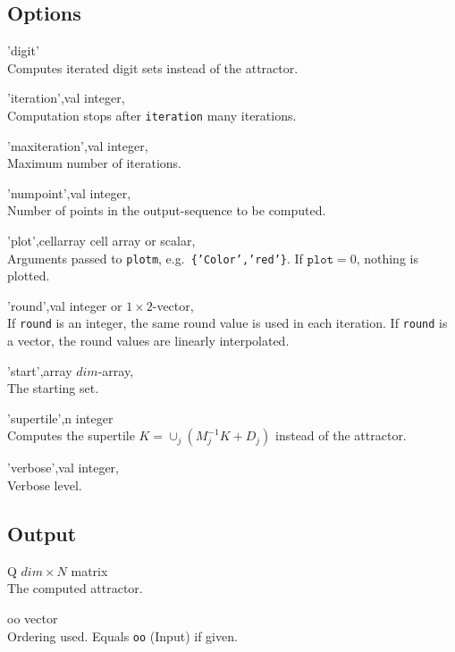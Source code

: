 \subsection*{Options}
\begin{param}
\item['digit']                    \\Computes iterated digit sets instead of the attractor.

\item['iteration',val]             integer, \\
Computation stops after \texttt{iteration} many iterations.

\item['maxiteration',val]          integer, \\Maximum number of iterations.

\item['numpoint',val]              integer, \\Number of points in the output-sequence to be computed.

\item['plot',cellarray]            cell array or scalar, \\
Arguments passed to \texttt{plotm}, e.g.\ \texttt{\{'Color','red'\}}.
If $\texttt{plot}=0$, nothing is plotted.

\item['round',val]                integer or $1\times 2$-vector, \\
If \texttt{round} is an integer, the same round value is used in each iteration.
If \texttt{round} is a vector, the round values are linearly interpolated.

\item['start',array]              $dim$-array, \\The starting set.

\item['supertile',n]              integer\\Computes the supertile $K=\cup_{j}(M_j^{-1}K+D_j)$ instead of the attractor. 

\item['verbose',val]              integer, \\Verbose level.

\end{param}

\subsection*{Output}
\begin{param}
\item[Q] $dim\times N$ matrix\\The computed attractor.
\item[oo] vector\\Ordering used. Equals \texttt{oo} (Input) if given.
\end{param}
    

